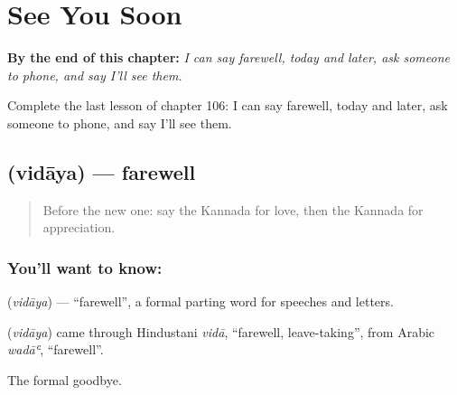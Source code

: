 
\chapter{See You Soon}
\label{ch:ka-see-you-soon}

\begin{chapteropening}
\textbf{By the end of this chapter:} \emph{I can say farewell, today and later, ask someone to phone, and say I'll see them.}

Complete the last lesson of chapter 106: I can say farewell, today and later, ask someone to phone, and say I'll see them.
\end{chapteropening}

\section[\texorpdfstring{\kn{ವಿದಾಯ} (vidāya)}{ವಿದಾಯ (vidāya)}]{ (vidāya) — farewell}

\label{lesson:KA-C106-farewell}



\begin{quote}
Before the new one: say the Kannada for love, then the Kannada for appreciation.
\end{quote}

\subsection*{You'll want to know: }
\textbf{} (\emph{vidāya}) — \textquotedblleft{}farewell\textquotedblright{}, a formal parting word for speeches and letters.

\begin{cousinweb}
\textbf{} (\emph{vidāya}) came through Hindustani \emph{vidā}, \textquotedblleft{}farewell, leave-taking\textquotedblright{}, from Arabic \emph{wadāʿ}, \textquotedblleft{}farewell\textquotedblright{}.
\end{cousinweb}

\begin{grammarlens}[title={What you've built}]
The formal goodbye.
\end{grammarlens}

